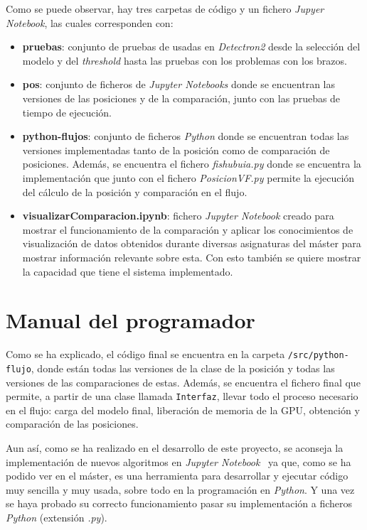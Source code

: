 Como se puede observar, hay tres carpetas de código y un fichero \textit{Jupyer Notebook}, las cuales corresponden con:
\begin{itemize}
	\item \textbf{pruebas}: conjunto de pruebas de usadas en \textit{Detectron2} desde la selección del modelo y del \textit{threshold} hasta las pruebas con los problemas con los brazos.
	\item \textbf{pos}: conjunto de ficheros de \textit{Jupyter Notebooks} donde se encuentran las versiones de las posiciones y de la comparación, junto con las pruebas de tiempo de ejecución.
	\item \textbf{python-flujos}: conjunto de ficheros \textit{Python} donde se encuentran todas las versiones implementadas tanto de la posición como de comparación de posiciones. Además, se encuentra el fichero \textit{fishubuia.py} donde se encuentra la implementación que junto con el fichero \textit{PosicionVF.py} permite la ejecución del cálculo de la posición y comparación en el flujo.
	\item \textbf{visualizarComparacion.ipynb}: fichero \textit{Jupyter Notebook} creado para mostrar el funcionamiento de la comparación y aplicar los conocimientos de visualización de datos obtenidos durante diversas asignaturas del máster para mostrar información relevante sobre esta. Con esto también se quiere mostrar la capacidad que tiene el sistema implementado.
\end{itemize}

\section{Manual del programador}
Como se ha explicado, el código final se encuentra en la carpeta \texttt{/src/python-flujo}, donde están todas las versiones de la clase de la posición y todas las versiones de las comparaciones de estas. Además, se encuentra el fichero final que permite, a partir de una clase llamada \texttt{Interfaz}, llevar todo el proceso necesario en el flujo: carga del modelo final, liberación de memoria de la GPU, obtención y comparación de las posiciones.

Aun así, como se ha realizado en el desarrollo de este proyecto, se aconseja la implementación de nuevos algoritmos en \textit{Jupyter Notebook}~\cite{Kluyver:2016aa} ya que, como se ha podido ver en el máster, es una herramienta para desarrollar y ejecutar código muy sencilla y muy usada, sobre todo en la programación en \textit{Python}. Y una vez se haya probado su correcto funcionamiento pasar su implementación a ficheros \textit{Python} (extensión \textit{.py}).

